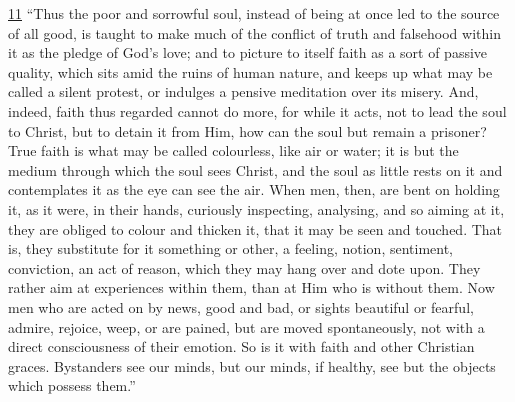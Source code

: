 \documentclass[
]{book}
\begin{document}
\protect\hyperlink{sdfootnote11anc}{11} ``Thus the poor and sorrowful soul, instead of being at once led to the source of all good, is taught to make much of the conflict of truth and falsehood within it as the pledge of God's love; and to picture to itself faith as a sort of passive quality, which sits amid the ruins of human nature, and keeps up what may be called a silent protest, or indulges a pensive meditation over its misery. And, indeed, faith thus regarded cannot do more, for while it acts, not to lead the soul to Christ, but to detain it from Him, how can the soul but remain a prisoner? True faith is what may be called colourless, like air or water; it is but the medium through which the soul sees Christ, and the soul as little rests on it and contemplates it as the eye can see the air. When men, then, are bent on holding it, as it were, in their hands, curiously inspecting, analysing, and so aiming at it, they are obliged to colour and thicken it, that it may be seen and touched. That is, they substitute for it something or other, a feeling, notion, sentiment, conviction, an act of reason, which they may hang over and dote upon. They rather aim at experiences within them, than at Him who is without them. Now men who are acted on by news, good and bad, or sights beautiful or fearful, admire, rejoice, weep, or are pained, but are moved spontaneously, not with a direct consciousness of their emotion. So is it with faith and other Christian graces. Bystanders see our minds, but our minds, if healthy, see but the objects which possess them.''
\end{document}
